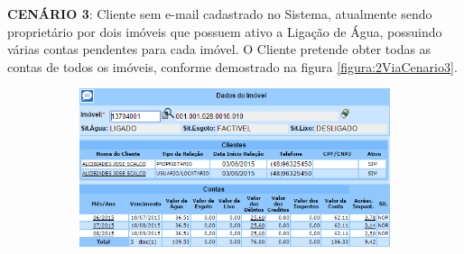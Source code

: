 \begin{flushleft}
	\begin{description}
		\item \textbf{CENÁRIO 3}: Cliente sem e-mail cadastrado no Sistema, atualmente sendo proprietário por dois imóveis que possuem ativo a Ligação de Água, possuindo várias contas pendentes para cada imóvel. O Cliente pretende obter todas as contas de todos os imóveis, conforme demostrado na figura \ref{figura:2ViaCenario3}.
		\begin{figure}[H]
			\centering
			\caption{\textbf{Obter 2ª via - Cenário de Teste 3}}
			\label{figura:2ViaCenario3}
			\begin{subfigure}[H]{\textwidth}
				\centering
				\includegraphics{figuras/cenarios/segunda_via/cenario_3.PNG}
			\end{subfigure}
		\end{figure}
	\end{description}
	
\end{flushleft}


